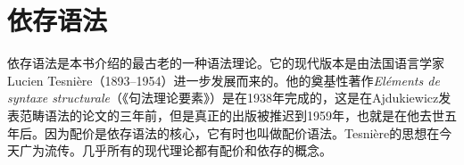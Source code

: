 \chapter{依存语法}
\label{Kapitel-DG}

依存语法是本书介绍的最古老的一种语法理论。它的现代版本是由法国语言学家Lucien Tesnière（1893--1954）进一步发展而来的。他的奠基性著作\emph{Eléments de syntaxe structurale}（《句法理论要素》）是在1938年完成的，这是在Ajdukiewicz发表范畴语法的论文的三年前\citeyearpar{Ajdukiewicz35a-u}，但是真正的出版被推迟到1959年，也就是在他去世五年后\nocite{Tesniere59a-u}。因为配价是依存语法的核心，它有时也叫做配价语法。Tesnière的思想在今天广为流传。几乎所有的现代理论都有配价和依存的概念\citep[--263, 284]{AF2010a}。

